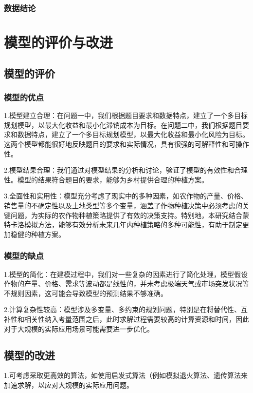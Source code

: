 \documentclass{cumcmthesis}
\begin{document}
\subsubsection{数据结论}






\section{模型的评价与改进}
\subsection{模型的评价}
\subsubsection{模型的优点}
1.模型建立合理：在问题一中，我们根据题目要求和数据特点，建立了一个多目标规划模型，以最大化收益和最小化滞销成本为目标。在问题二中，我们根据题目要求和数据特点，建立了一个多目标规划模型，以最大化收益和最小化风险为目标。这两个模型都能很好地反映题目的要求和实际情况，具有很强的可解释性和可操作性。

2.模型结果合理：我们通过对模型结果的分析和讨论，验证了模型的有效性和合理性。模型的结果符合题目的要求，能够为乡村提供合理的种植方案。

3.全面性和实用性：模型充分考虑了现实中的多种因素，如农作物的产量、价格、销售量的不确定性以及土地类型等多个变量，涵盖了作物种植决策中必须考虑的关键问题，为实际的农作物种植策略提供了有效的决策支持。特别地，本研究结合蒙特卡洛模拟方法，能够有效分析未来几年内种植策略的多种可能性，有助于制定更加稳健的种植方案。
\subsubsection{模型的缺点}
1.模型的简化：在建模过程中，我们对一些复杂的因素进行了简化处理，模型假设作物的产量、价格、需求等波动都是线性的，并未考虑极端天气或市场突发状况等不规则因素，这可能会导致模型的预测结果不够准确。

2.计算复杂性较高：模型涉及多变量、多约束的规划问题，特别是在将替代性、互补性和相关性纳入考量范围之后，此时求解过程需要较高的计算资源和时间，因此对于大规模的实际应用场景可能需要进一步优化。


\subsection{模型的改进}
1.可考虑采取更高效的算法，如使用启发式算法（例如模拟退火算法、遗传算法\cite{ref3}来加速求解，以应对大规模的实际应用问题。
\end{document}
